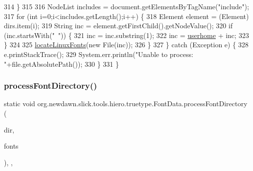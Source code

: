\begin{DoxyCode}
314             \}
315             
316             NodeList includes = document.getElementsByTagName(\textcolor{stringliteral}{"include"});
317             \textcolor{keywordflow}{for} (\textcolor{keywordtype}{int} i=0;i<includes.getLength();i++) \{
318                 Element element = (Element) dirs.item(i);
319                 String inc = element.getFirstChild().getNodeValue();
320                 \textcolor{keywordflow}{if} (inc.startsWith(\textcolor{stringliteral}{"~"})) \{
321                     inc = inc.substring(1);
322                     inc = \mbox{\hyperlink{classorg_1_1newdawn_1_1slick_1_1tools_1_1hiero_1_1truetype_1_1_font_data_af0be3d061e554e3951a5cb44c2a693c5}{userhome}} + inc;
323                 \}
324                 
325                 \mbox{\hyperlink{classorg_1_1newdawn_1_1slick_1_1tools_1_1hiero_1_1truetype_1_1_font_data_ac8716e3eb111f218e090463b4adb655e}{locateLinuxFonts}}(\textcolor{keyword}{new} File(inc));
326             \}
327         \} \textcolor{keywordflow}{catch} (Exception e) \{
328             e.printStackTrace();
329             System.err.println(\textcolor{stringliteral}{"Unable to process: "}+file.getAbsolutePath());
330         \}
331     \}
\end{DoxyCode}
\mbox{\label{classorg_1_1newdawn_1_1slick_1_1tools_1_1hiero_1_1truetype_1_1_font_data_a8c35c1c3236ac00f0639ae1947656d28}} 
\subsubsection{\texorpdfstring{process\+Font\+Directory()}{processFontDirectory()}}
{\footnotesize\ttfamily static void org.\+newdawn.\+slick.\+tools.\+hiero.\+truetype.\+Font\+Data.\+process\+Font\+Directory (\begin{DoxyParamCaption}\item[{File}]{dir,  }\item[{Array\+List}]{fonts }\end{DoxyParamCaption})\hspace{0.3cm}{\ttfamily [inline]}, {\ttfamily [static]}, {\ttfamily [private]}}

